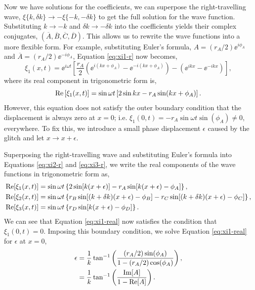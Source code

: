 Now we have solutions for the coefficients, we can superpose the right-travelling wave, \(\xi\{k, \delta k\} \rightarrow - \xi\{-k, -\delta k\}\) to get the full solution for the wave function. Substituting \(k \rightarrow -k\) and \(\delta k \rightarrow -\delta k\) into the coefficients yields their complex conjugates, \((\overline{A},\overline{B},\overline{C},\overline{D})\). This allows us to rewrite the wave functions into a more flexible form. For example, substituting Euler's formula, \(A = (r_A/2) \ee^{i\phi_A}\) and \(\overline{A} = (r_A/2) \ee^{-i\phi_A}\), Equation \ref{eq:xi1-r} now becomes,
%
\begin{equation}
    \xi_1(x, t) = \ee^{i \omega t} \left[ \frac{r_A}{2} \left( \ee^{i(kx + \phi_A)} - \ee^{-i(kx + \phi_A)} \right) - \left( \ee^{ikx} - \ee^{-ikx} \right) \right], \label{eq:xi1}
\end{equation}
%
where its real component in trigonometric form is,
\begin{equation}
    {\mathrm{Re}}\left[\xi_1(x, t)\right] = \sin \omega t \left[2 \sin kx - r_A \sin(kx + \phi_A)\right].
\end{equation}
%
However, this equation does not satisfy the outer boundary condition that the displacement is always zero at \(x=0\); i.e. \(\xi_1(0, t) = - r_A \sin \omega t \sin(\phi_A) \neq 0\), everywhere. To fix this, we introduce a small phase displacement \(\epsilon\) caused by the glitch and let \(x \rightarrow x + \epsilon\).

Superposing the right-travelling wave and substituting Euler's formula into Equations \ref{eq:xi2-r} and \ref{eq:xi3-r}, we write the real components of the wave functions in trigonometric form as,
%
\begin{align}
    {\mathrm{Re}}[\xi_1(x, t)] &= \sin \omega t \left\{2 \sin[k (x + \epsilon)] - r_A \sin[k(x + \epsilon) - \phi_A]\right\}, \label{eq:xi1-real} \\
    {\mathrm{Re}}[\xi_2(x, t)] &= \sin \omega t \left\{ r_B \sin[(k + \delta k)(x + \epsilon) - \phi_B] - r_C \sin[(k + \delta k)(x + \epsilon) - \phi_C]\right\}, \\
    {\mathrm{Re}}[\xi_3(x, t)] &= \sin \omega t \left\{r_D \sin[k(x + \epsilon) - \phi_D]\right\}. \label{eq:xi3-real}
\end{align}
%
We can see that Equation \ref{eq:xi1-real} now satisfies the condition that \(\xi_1(0, t) = 0\). Imposing this boundary condition, we solve Equation \ref{eq:xi1-real} for \(\epsilon\) at \(x=0\),
%
\begin{align}
    \epsilon &= \frac{1}{k} \tan^{-1}\left( \frac{(r_A / 2) \sin(\phi_A)}{1 - (r_A/2) \cos(\phi_A)} \right), \notag\\
    &= \frac{1}{k} \tan^{-1}\left( \frac{{\mathrm{Im}}[A]}{1 - {\mathrm{Re}}[A]} \right). \label{eq:1d-phase}
\end{align}
%

